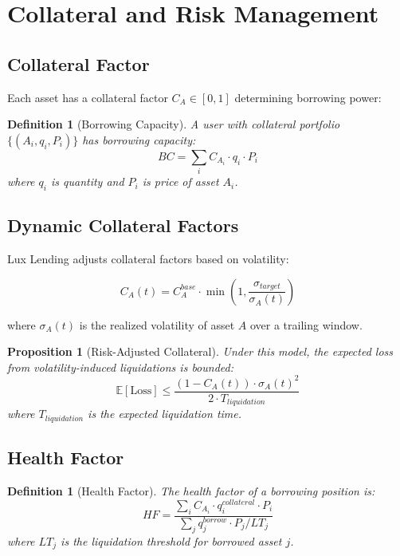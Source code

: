 \documentclass[11pt,a4paper]{article}
\newtheorem{proposition}[theorem]{Proposition}
\newtheorem{definition}[theorem]{Definition}
\begin{document}
\section{Collateral and Risk Management}

\subsection{Collateral Factor}

Each asset has a collateral factor $C_A \in [0, 1]$ determining borrowing power:

\begin{definition}[Borrowing Capacity]
A user with collateral portfolio $\{(A_i, q_i, P_i)\}$ has borrowing capacity:
\begin{equation}
    BC = \sum_i C_{A_i} \cdot q_i \cdot P_i
\end{equation}
where $q_i$ is quantity and $P_i$ is price of asset $A_i$.
\end{definition}

\subsection{Dynamic Collateral Factors}

Lux Lending adjusts collateral factors based on volatility:

\begin{equation}
    C_A(t) = C_A^{base} \cdot \min\left(1, \frac{\sigma_{target}}{\sigma_A(t)}\right)
\end{equation}

where $\sigma_A(t)$ is the realized volatility of asset $A$ over a trailing window.

\begin{proposition}[Risk-Adjusted Collateral]
Under this model, the expected loss from volatility-induced liquidations is bounded:
\begin{equation}
    \mathbb{E}[\text{Loss}] \leq \frac{(1 - C_A(t)) \cdot \sigma_A(t)^2}{2 \cdot T_{liquidation}}
\end{equation}
where $T_{liquidation}$ is the expected liquidation time.
\end{proposition}

\subsection{Health Factor}

\begin{definition}[Health Factor]
The health factor of a borrowing position is:
\begin{equation}
    HF = \frac{\sum_i C_{A_i} \cdot q_i^{collateral} \cdot P_i}{\sum_j q_j^{borrow} \cdot P_j / LT_j}
\end{equation}
where $LT_j$ is the liquidation threshold for borrowed asset $j$.
\end{definition}
\end{document}
